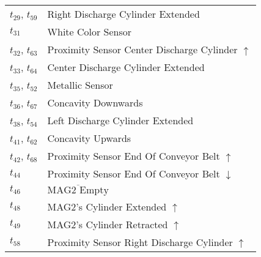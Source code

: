 \begin{longtable}{M{5cm}M{10cm}}
\hyperlink{completeNet:t29}{\hypertarget{completeTable:t29}{$t_{29}$}}, \hyperlink{completeNet:t59}{\hypertarget{completeTable:t59}{$t_{59}$}} & Right Discharge Cylinder Extended\\
\hyperlink{completeNet:t31}{\hypertarget{completeTable:t31}{$t_{31}$}} & White Color Sensor\\
\hyperlink{completeNet:t32}{\hypertarget{completeTable:t32}{$t_{32}$}}, \hyperlink{completeNet:t63}{\hypertarget{completeTable:t63}{$t_{63}$}} & Proximity Sensor Center Discharge Cylinder \(\uparrow\)\\
\hyperlink{completeNet:t33}{\hypertarget{completeTable:t33}{$t_{33}$}}, \hyperlink{completeNet:t64}{\hypertarget{completeTable:t64}{$t_{64}$}} & Center Discharge Cylinder Extended\\
\hyperlink{completeNet:t35}{\hypertarget{completeTable:t35}{$t_{35}$}}, \hyperlink{completeNet:t52}{\hypertarget{completeTable:t52}{$t_{52}$}} & Metallic Sensor\\
\hyperlink{completeNet:t36}{\hypertarget{completeTable:t36}{$t_{36}$}}, \hyperlink{completeNet:t67}{\hypertarget{completeTable:t67}{$t_{67}$}} & Concavity Downwards\\
\hyperlink{completeNet:t38}{\hypertarget{completeTable:t38}{$t_{38}$}}, \hyperlink{completeNet:t54}{\hypertarget{completeTable:t54}{$t_{54}$}} & Left Discharge Cylinder Extended\\
\hyperlink{completeNet:t41}{\hypertarget{completeTable:t41}{$t_{41}$}}, \hyperlink{completeNet:t62}{\hypertarget{completeTable:t62}{$t_{62}$}} & Concavity Upwards\\
\hyperlink{completeNet:t42}{\hypertarget{completeTable:t42}{$t_{42}$}}, \hyperlink{completeNet:t68}{\hypertarget{completeTable:t68}{$t_{68}$}} & Proximity Sensor End Of Conveyor Belt \(\uparrow\)\\
\hyperlink{completeNet:t44}{\hypertarget{completeTable:t44}{$t_{44}$}} & Proximity Sensor End Of Conveyor Belt \(\downarrow\)\\
\hyperlink{completeNet:t46}{\hypertarget{completeTable:t46}{$t_{46}$}} & \(\overline{\mbox{MAG2 Empty}}\)\\
\hyperlink{completeNet:t48}{\hypertarget{completeTable:t48}{$t_{48}$}} & MAG2's Cylinder Extended \(\uparrow\)\\
\hyperlink{completeNet:t49}{\hypertarget{completeTable:t49}{$t_{49}$}} & MAG2's Cylinder Retracted \(\uparrow\)\\
\hyperlink{completeNet:t58}{\hypertarget{completeTable:t58}{$t_{58}$}} & Proximity Sensor Right Discharge Cylinder \(\uparrow\)\\

\end{longtable}
